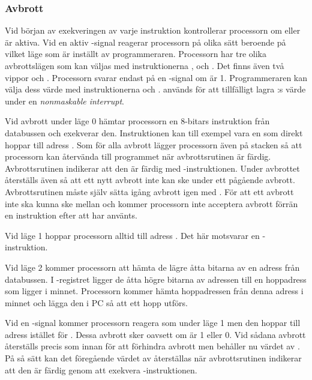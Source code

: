 \documentclass[main.tex]{subfiles}
\begin{document}
\subsubsection{Avbrott}
Vid början av exekveringen av varje instruktion kontrollerar processorn om
 eller  är aktiva. Vid en aktiv -signal reagerar
processorn på olika sätt beroende på vilket läge som är inställt av
programmeraren. Processorn har tre olika avbrottslägen som kan väljas med
instruktionerna ,  och . Det finns även två
vippor  och . Processorn svarar endast på en
-signal om  är 1. Programmeraren kan välja dess värde med
instruktionerna  och .  används för att
tillfälligt lagra :s värde under en {\it nonmaskable interrupt}.

Vid avbrott under läge 0 hämtar processorn en 8-bitars instruktion från
databussen och exekverar den. Instruktionen kan till exempel vara en  som direkt hoppar till adress . Som för alla avbrott lägger
processorn även  på stacken så att processorn kan återvända till
programmet när avbrottsrutinen är färdig. Avbrottsrutinen indikerar att den är
färdig med -instruktionen. Under avbrottet återställs även
 så att ett nytt avbrott inte kan ske under ett pågående avbrott.
Avbrottsrutinen måste själv sätta igång avbrott igen med . För att ett
avbrott inte ska kunna ske mellan  och  kommer processorn
inte acceptera avbrott förrän en instruktion efter att  har använts.

Vid läge 1 hoppar processorn alltid till adress . Det här
motsvarar en -instruktion.

Vid läge 2 kommer processorn att hämta de lägre åtta bitarna av en adress från
databussen. I -registret ligger de åtta högre bitarna av adressen till
en hoppadress som ligger i minnet. Processorn kommer hämta hoppadressen från
denna adress i minnet och lägga den i PC så att ett hopp utförs.

Vid en -signal kommer processorn reagera som under läge 1 men den
hoppar till adress  istället för . Dessa avbrott sker
oavsett om  är 1 eller 0. Vid sådana avbrott återställs 
precis som innan för att förhindra avbrott men  behåller nu värdet
av . På så sätt kan det föregående värdet av  återställas
när avbrottsrutinen indikerar att den är färdig genom att exekvera
-instruktionen.
\end{document}
